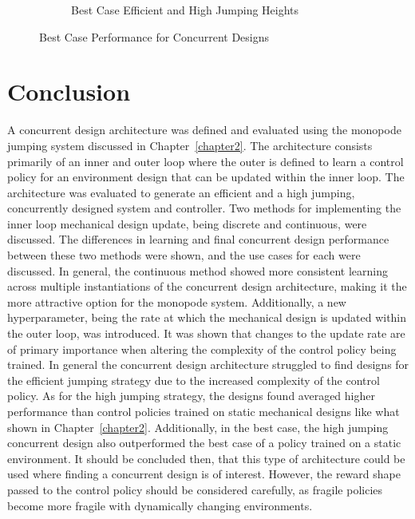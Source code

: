 \begin{figure}[tb!]
\begin{subfigure}{.49\textwidth}
    \caption{Best Case Efficient and High Jumping Heights}
    \label{fig:conc_best_rodpos}
  \end{subfigure}
   \caption{Best Case Performance for Concurrent Designs}
   \label{fig:conc_best_performance}
\end{figure}
% 


\section{Conclusion}
A concurrent design architecture was defined and evaluated using the monopode jumping system discussed in Chapter~\ref{chapter2}. The architecture consists primarily of an inner and outer loop where the outer is defined to learn a control policy for an environment design that can be updated within the inner loop. The architecture was evaluated to generate an efficient and a high jumping, concurrently designed system and controller. Two methods for implementing the inner loop mechanical design update, being discrete and continuous, were discussed. The differences in learning and final concurrent design performance between these two methods were shown, and the use cases for each were discussed. In general, the continuous method showed more consistent learning across multiple instantiations of the concurrent design architecture, making it the more attractive option for the monopode system. Additionally, a new hyperparameter, being the rate at which the mechanical design is updated within the outer loop, was introduced. It was shown that changes to the update rate are of primary importance when altering the complexity of the control policy being trained. In general the concurrent design architecture struggled to find designs for the efficient jumping strategy due to the increased complexity of the control policy. As for the high jumping strategy, the designs found averaged higher performance than control policies trained on static mechanical designs like what shown in Chapter~\ref{chapter2}. Additionally, in the best case, the high jumping concurrent design also outperformed the best case of a policy trained on a static environment. It should be concluded then, that this type of architecture could be used where finding a concurrent design is of interest. However, the reward shape passed to the control policy should be considered carefully, as fragile policies become more fragile with dynamically changing environments.